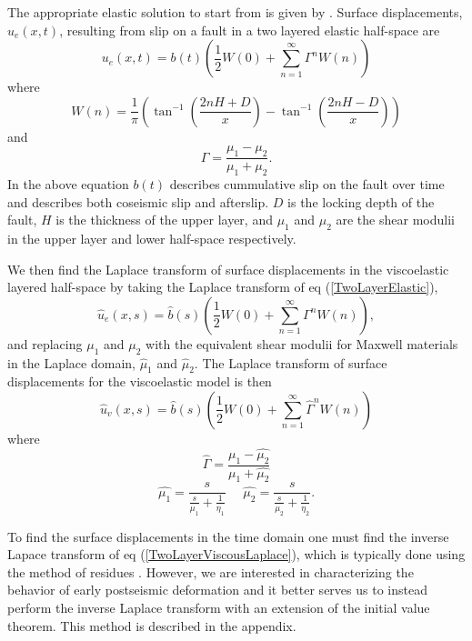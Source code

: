 \documentclass[12pt]{article}
\begin{document}
The appropriate elastic solution to start from
is given by \citet{R1971}.  Surface displacements, $u_{e}(x,t)$,
resulting from slip on a fault in a two layered elastic half-space
are
\begin{equation}\label{TwoLayerElastic}
  u_{e}(x,t) = b(t)\left(\frac{1}{2} W(0) + 
    \sum_{n=1}^\infty \Gamma^nW(n)\right)
\end{equation}
where
\begin{equation}
  W(n) = \frac{1}{\pi}\left(\tan^{-1}(\frac{2nH + D}{x}) 
    - \tan^{-1}(\frac{2nH - D}{x})\right)
\end{equation}
and
\begin{equation}
  \Gamma = \frac{\mu_1 - \mu_2}{\mu_1 + \mu_2}.
\end{equation}
In the above equation $b(t)$ describes cummulative slip on the fault
over time and describes both coseismic slip and afterslip. $D$ is the
locking depth of the fault, $H$ is the thickness of the upper layer,
and $\mu_1$ and $\mu_2$ are the shear modulii in the upper layer and
lower half-space respectively.

We then find the Laplace transform of surface displacements in the
viscoelastic layered half-space by taking the Laplace transform of eq
(\ref{TwoLayerElastic}), 
\begin{equation}\label{TwoLayerElasticLaplace}
 \hat{u}_e(x,s) = \hat{b}(s)\left(\frac{1}{2} W(0) +\sum_{n=1}^\infty\Gamma^nW(n)\right),
\end{equation}
and replacing $\mu_1$ and $\mu_2$ with the
equivalent shear modulii for Maxwell materials in the Laplace domain,
$\hat{\mu}_1$ and $\hat{\mu}_2$.  The Laplace transform of surface
displacements for the viscoelastic model is then
\begin{equation}\label{TwoLayerViscousLaplace}
 \hat{u}_v(x,s) = \hat{b}(s)\left(\frac{1}{2}W(0) +\sum_{n=1}^\infty\hat{\Gamma}^nW(n)\right)
\end{equation}
where
\begin{equation}
  \hat{\Gamma} = \frac{\hat{\mu_1} - \hat{\mu_2}}{\hat{\mu_1} + \hat{\mu_2}}
\end{equation}
\begin{equation}
  \hat{\mu_1} = \frac{s}{\frac{s}{\mu_1} + \frac{1}{\eta_1}} \,\,\,\,\,\,\,\,  
  \hat{\mu_2} = \frac{s}{\frac{s}{\mu_2} + \frac{1}{\eta_2}}.
\end{equation}

To find the surface displacements in the time domain one must find the
inverse Lapace transform of eq (\ref{TwoLayerViscousLaplace}), which
is typically done using the method of residues
\citep[e.g.][]{NM1974}. However, we are interested in characterizing
the behavior of early postseismic deformation and it better serves
us to instead perform the inverse Laplace transform with an extension
of the initial value theorem. This method is described in the
appendix.
\end{document}
